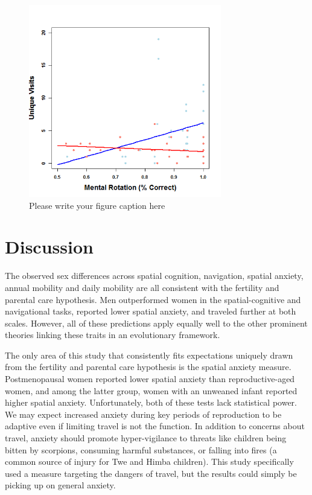 \begin{figure}[!htb]
  \includegraphics[width=0.75\textwidth]{mw_acctot}
\caption{Please write your figure caption here}
\label{fig:1}       %
\end{figure}

\section{Discussion}
\label{sec:4}

The observed sex differences across spatial cognition, navigation, spatial anxiety, annual mobility and daily mobility are all consistent with the fertility and parental care hypothesis.  Men outperformed women in the spatial-cognitive and navigational tasks, reported lower spatial anxiety, and traveled further at both scales.  However, all of these predictions apply equally well to the other prominent theories linking these traits in an evolutionary framework.  

The only area of this study that consistently fits expectations uniquely drawn from the fertility and parental care hypothesis is the spatial anxiety measure.  Postmenopausal women reported lower spatial anxiety than reproductive-aged women, and among the latter group, women with an unweaned infant reported higher spatial anxiety.  Unfortunately, both of these tests lack statistical power.  We may expect increased anxiety during key periods of reproduction to be adaptive even if limiting travel is not the function.  In addition to concerns about travel, anxiety should promote hyper-vigilance to threats like children being bitten by scorpions, consuming harmful substances, or falling into fires (a common source of injury for Twe and Himba children).  This study specifically used a measure targeting the dangers of travel, but the results could simply be picking up on general anxiety.


